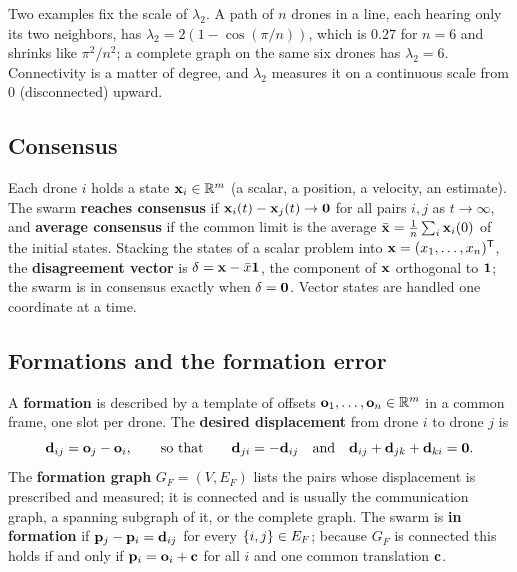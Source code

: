 Two examples fix the scale of $\lambda_2$. A path of $n$ drones in a line, each
hearing only its two neighbors, has $\lambda_2 = 2(1 - \cos(\pi/n))$, which is
$0.27$ for $n = 6$ and shrinks like $\pi^2/n^2$; a complete graph on the same
six drones has $\lambda_2 = 6$. Connectivity is a matter of degree, and
$\lambda_2$ measures it on a continuous scale from $0$ (disconnected) upward.

\subsection{Consensus}

\begin{definition}[Consensus]
\label{def:ch23-consensus}
Each drone $i$ holds a state $\mathbf{x}_i \in \mathbb{R}^m$ (a scalar, a position, a
velocity, an estimate). The swarm \textbf{reaches consensus}
if $\mathbf{x}_i(t) - \mathbf{x}_j(t) \to \mathbf{0}$ for all pairs $i, j$ as
$t \to \infty$, and \textbf{average consensus} if the
common limit is the average $\bar{\mathbf{x}} = \frac{1}{n}\sum_i \mathbf{x}_i(0)$
of the initial states. Stacking the states of a scalar problem into
$\mathbf{x} = (x_1, \dots, x_n)^{\mathsf{T}}$, the \textbf{disagreement vector}
is $\mathbf{\delta} = \mathbf{x} - \bar{x}\mathbf{1}$, the component of $\mathbf{x}$
orthogonal to $\mathbf{1}$; the swarm is in consensus exactly when
$\mathbf{\delta} = \mathbf{0}$. Vector states are handled one coordinate at a time.
\end{definition}

\subsection{Formations and the formation error}

\begin{definition}
\label{def:ch23-formation}
A \textbf{formation} is described by a template of
offsets $\mathbf{o}_1, \dots, \mathbf{o}_n \in \mathbb{R}^m$ in a common frame, one slot per
drone. The \textbf{desired displacement}
from drone $i$ to drone $j$ is
\begin{equation}
  \mathbf{d}_{ij} = \mathbf{o}_j - \mathbf{o}_i, \qquad\text{so that}\qquad
  \mathbf{d}_{ji} = -\mathbf{d}_{ij}
  \quad\text{and}\quad
  \mathbf{d}_{ij} + \mathbf{d}_{jk} + \mathbf{d}_{ki} = \mathbf{0}.
  \label{eq:ch23-dij}
\end{equation}
The \textbf{formation graph} $G_F = (V, E_F)$ lists the
pairs whose displacement is prescribed and measured; it is connected and is
usually the communication graph, a spanning subgraph of it, or the complete
graph. The swarm is \textbf{in formation} if $\mathbf{p}_j - \mathbf{p}_i = \mathbf{d}_{ij}$
for every $\left\{ i, j \right\} \in E_F$; because $G_F$ is connected this holds if and
only if $\mathbf{p}_i = \mathbf{o}_i + \mathbf{c}$ for all $i$ and one common translation
$\mathbf{c}$.
\end{definition}

